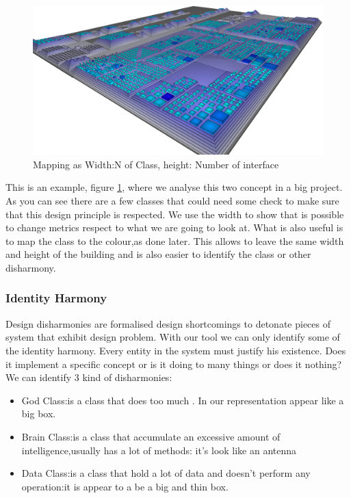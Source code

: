 \documentclass[]{usiinfbachelorproject}
\begin{document}
\begin{figure}[H]
\centering
\includegraphics[width=.60\textwidth]{images/ClassesAndInterfaces}
\caption[Classes and Interfaces Mapping]{Mapping as Width:N of Class, height: Number of interface \label{fig:classInterface}
}
	
\end{figure}

This is an example, figure \ref{fig:classInterface}, where we analyse this two concept in a big project.
As you can see there are a few classes that could need some check to make sure that this design  principle is respected. We use the width to show that is possible to change metrics respect to what we are going to look at. What is also useful is to map the class to the colour,as done later. This allows to leave the same width and height of the building and is also easier to identify the class or other disharmony. 


\subsubsection{Identity Harmony	}\label{sec:idHarmony}
Design disharmonies are formalised design shortcomings to detonate pieces of system that exhibit design problem. With our tool we can only identify some of the identity harmony. Every entity in the system must justify his existence. Does it implement a specific concept or is it doing to many things or does  it nothing?\\

We can identify 3 kind of disharmonies:
\begin{itemize}

\item{God Class}:is a class that does too much . In our representation appear like a big box.
\item{Brain Class}:is a class that accumulate an excessive amount of intelligence,usually has a lot of methods: it's look like an antenna
\item{Data Class}:is a class that hold a lot of data and doesn't perform any operation:it is appear to a be a big and thin box.

\end{itemize} 
\end{document}
